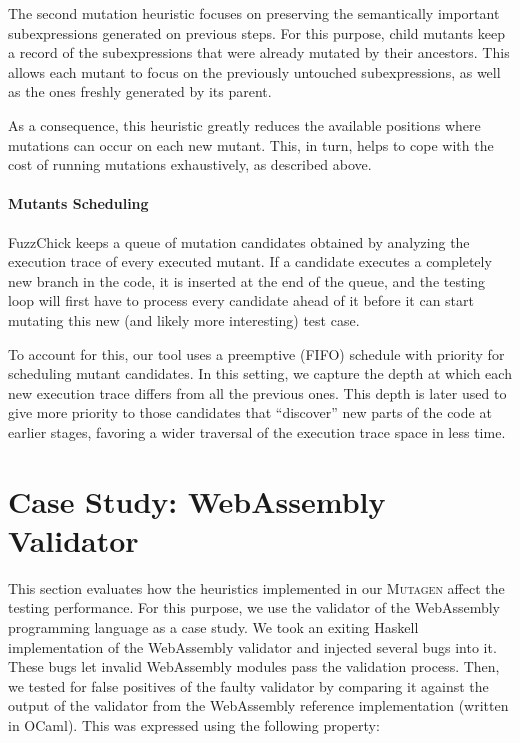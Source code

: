 \documentclass[10pt,conference]{IEEEtran}
\newcommand{\ourtool}{\textsc{Mutagen}\xspace}
\begin{document}
The second mutation heuristic focuses on preserving the semantically important
subexpressions generated on previous steps.
%
For this purpose, child mutants keep a record of the subexpressions that were
already mutated by their ancestors.
%
This allows each mutant to focus on the previously untouched subexpressions, as
well as the ones freshly generated by its parent.

As a consequence, this heuristic greatly reduces the available positions where
mutations can occur on each new mutant.
%
This, in turn, helps to cope with the cost of running mutations exhaustively, as
described above.

\paragraph{Mutants Scheduling}

FuzzChick keeps a queue of mutation candidates obtained by analyzing the
execution trace of every executed mutant.
%
If a candidate executes a completely new branch in the code, it is inserted at
the end of the queue, and the testing loop will first have to process every
candidate ahead of it before it can start mutating this new (and likely more
interesting) test case.

To account for this, our tool uses a preemptive (FIFO) schedule with priority for
scheduling mutant candidates.
%
In this setting, we capture the depth at which each new execution trace differs
from all the previous ones.
%
This depth is later used to give more priority to those candidates that
``discover'' new parts of the code at earlier stages, favoring a wider
traversal of the execution trace space in less time.


\section{Case Study: WebAssembly Validator}
\label{sec:casestudy}

This section evaluates how the heuristics implemented in our \ourtool affect the
testing performance.
%
For this purpose, we use the validator of the WebAssembly programming language \cite{haas2017bringing}
as a case study.
%
%
We took an exiting Haskell implementation of the WebAssembly validator
\cite{wasm-lib} and injected several bugs into it.
%
These bugs let invalid WebAssembly modules pass the validation process.
%
Then, we tested for false positives of the faulty validator by comparing it
against the output of the validator from the WebAssembly reference
implementation (written in OCaml).
%
This was expressed using the following property:
\end{document}
